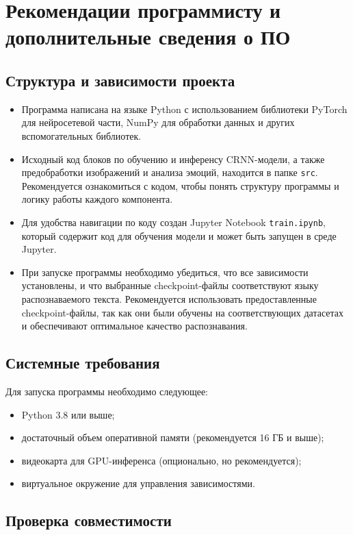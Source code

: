 \documentclass[12pt,a4paper]{article}
\begin{document}
\section{Рекомендации программисту и дополнительные сведения о ПО}

\subsection{Структура и зависимости проекта}

\begin{itemize}
    \item Программа написана на языке Python с использованием библиотеки PyTorch для нейросетевой части, NumPy для обработки данных и других вспомогательных библиотек.
    \item Исходный код блоков по обучению и инференсу CRNN-модели, а также предобработки изображений и анализа эмоций, находится в папке \texttt{src}. Рекомендуется ознакомиться с кодом, чтобы понять структуру программы и логику работы каждого компонента.
    \item Для удобства навигации по коду создан Jupyter Notebook \texttt{train.ipynb}, который содержит код для обучения модели и может быть запущен в среде Jupyter.
    \item При запуске программы необходимо убедиться, что все зависимости установлены, и что выбранные checkpoint-файлы соответствуют языку распознаваемого текста. Рекомендуется использовать предоставленные checkpoint-файлы, так как они были обучены на соответствующих датасетах и обеспечивают оптимальное качество распознавания.
\end{itemize}

\subsection{Системные требования}

Для запуска программы необходимо следующее:
\begin{itemize}
    \item Python 3.8 или выше;
    \item достаточный объем оперативной памяти (рекомендуется 16 ГБ и выше);
    \item видеокарта для GPU-инференса (опционально, но рекомендуется);
    \item виртуальное окружение для управления зависимостями.
\end{itemize}

\subsection{Проверка совместимости}
\end{document}
